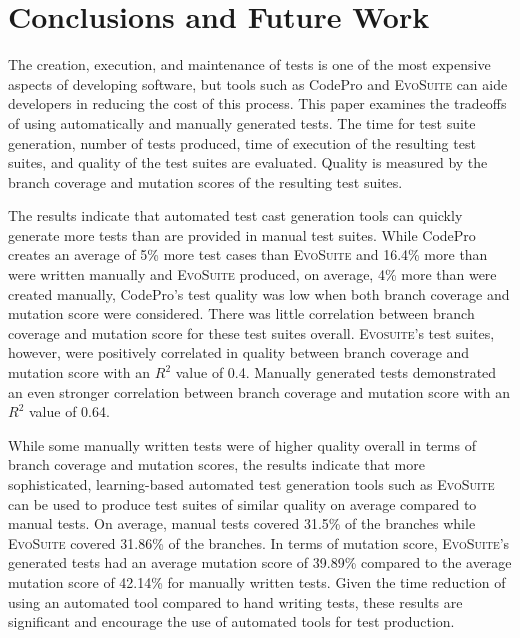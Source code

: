 
\section{Conclusions and Future Work}
\label{sec:conclusion}

The creation, execution, and maintenance of tests is one of the most expensive aspects of developing software, but tools
such as CodePro and \textsc{EvoSuite} can aide developers in reducing the cost of this process.  This paper examines the
tradeoffs of using automatically and manually generated tests.  The time for test suite generation, number of tests
produced, time of execution of the resulting test suites, and quality of the test suites are evaluated.  Quality is
measured by the branch coverage and mutation scores of the resulting test suites.

The results indicate that automated test cast generation tools can quickly generate more tests than are provided in manual test suites.  While CodePro creates an average of 5\% more test cases than \textsc{EvoSuite} and 16.4\% more than were written manually and \textsc{EvoSuite} produced, on average, 4\% more than were created manually, CodePro's test quality was low when both branch coverage and mutation score were considered.  There was little correlation between branch coverage and mutation score for these test suites overall.  \textsc{Evosuite}'s test suites, however, were positively correlated in quality between branch coverage and mutation score with an $R^2$ value of 0.4.  Manually generated tests demonstrated an even stronger correlation between branch coverage and mutation score with an $R^2$ value of 0.64.  

While some manually written tests were of higher quality overall in terms of branch coverage and mutation scores, the results indicate that more sophisticated, learning-based automated test generation tools such as \textsc{EvoSuite} can be used to produce test suites of similar quality on average compared to manual tests.  On average, manual tests covered 31.5\% of the branches while  \textsc{EvoSuite} covered 31.86\% of the branches. In terms of mutation score, \textsc{EvoSuite}'s generated tests had an average mutation score of 39.89\% compared to the average mutation score of 42.14\% for manually written tests.  Given the time reduction of using an automated tool compared to hand writing tests, these results are significant and encourage the use of automated tools for test production.  

